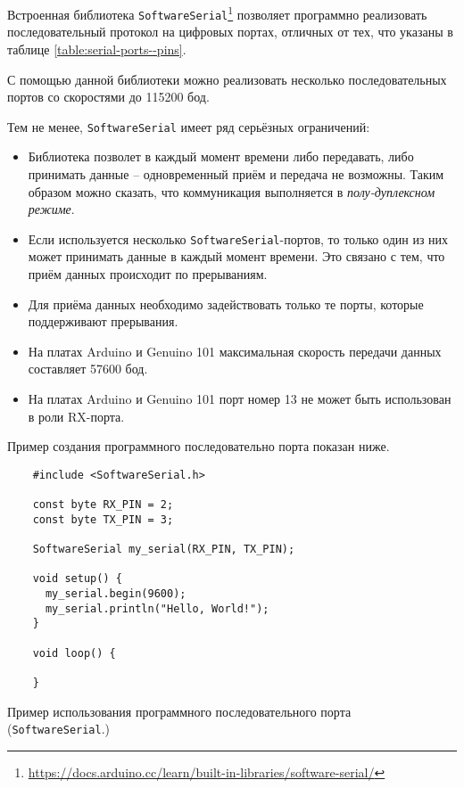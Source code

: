 \documentclass[../sparc.tex]{subfiles}
\begin{document}
Встроенная библиотека
\texttt{SoftwareSerial}\footnote{\url{https://docs.arduino.cc/learn/built-in-libraries/software-serial/}}
позволяет программно реализовать последовательный протокол на цифровых портах,
отличных от тех, что указаны в таблице \ref{table:serial-ports--pins}.

С помощью данной библиотеки можно реализовать несколько последовательных портов
со скоростями до 115200 бод.

Тем не менее, \texttt{SoftwareSerial} имеет ряд серьёзных ограничений:
\begin{itemize}
\item Библиотека позволет в каждый момент времени либо передавать, либо
  принимать данные -- одновременный приём и передача не возможны. Таким образом
  можно сказать, что коммуникация выполняется в \emph{полу-дуплексном режиме}.
\item Если используется несколько \texttt{SoftwareSerial}-портов, то только один
  из них может принимать данные в каждый момент времени.  Это связано с тем, что
  приём данных происходит по прерываниям.
\item Для приёма данных необходимо задействовать только те порты, которые
  поддерживают прерывания.
\item На платах Arduino и Genuino 101 максимальная скорость передачи данных
  составляет 57600 бод.
\item На платах Arduino и Genuino 101 порт номер 13 не может быть использован в
  роли RX-порта.
\end{itemize}

Пример создания программного последовательно порта показан ниже.

\begin{listing}[H]
  \begin{verbatim}
    #include <SoftwareSerial.h>

    const byte RX_PIN = 2;
    const byte TX_PIN = 3;

    SoftwareSerial my_serial(RX_PIN, TX_PIN);

    void setup() {
      my_serial.begin(9600);
      my_serial.println("Hello, World!");
    }

    void loop() {

    }
  \end{verbatim}
  \label{listing:communication-serial-software}
  \caption{Пример использования программного последовательного порта
    (\texttt{SoftwareSerial}.)}
\end{listing}
\end{document}

